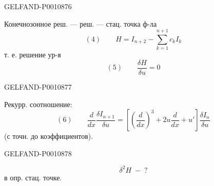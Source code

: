 \begin{GelfandAdjacentEvidence}{GELFAND-P001087}{6}


Конечнозонное реш. — реш. — стац. точка ф-ла
\[
(4)\qquad H=I_{n+2}-\sum_{k=1}^{n+1}c_k I_k
\]
т. е. решение ур-я
\[
(5)\qquad \frac{\delta H}{\delta u}=0
\]
\end{GelfandAdjacentEvidence}
\begin{GelfandAdjacentEvidence}{GELFAND-P001087}{7}


Рекурр. соотношение:
\[
(6)\qquad
\frac{d}{dx}\frac{\delta I_{n+1}}{\delta u}
=\left[\left(\frac{d}{dx}\right)^3+2u\frac{d}{dx}+u'\right]
\frac{\delta I_n}{\delta u}
\]
(с точн. до коэффициентов).
\end{GelfandAdjacentEvidence}
\begin{GelfandAdjacentEvidence}{GELFAND-P001087}{8}


\[
\delta^2 H\; -\; ?
\]
в опр. стац. точке.
\end{GelfandAdjacentEvidence}



